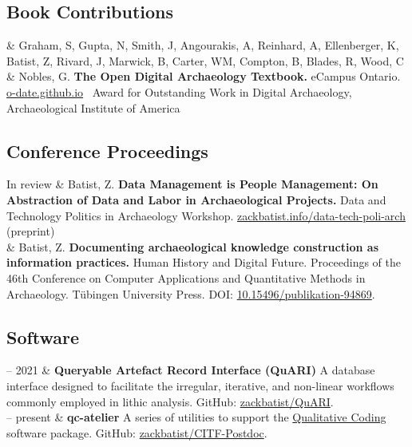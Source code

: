 \documentclass[11pt, a4paper]{article}
\newcommand{\LastName}{Batist}
\newcommand{\Initials}{Z}
\newcommand{\Me}{\LastName, \Initials}
\newcommand{\AndreasAngourakis}{Angourakis, A}
\newcommand{\RobBlades}{Blades, R}
\newcommand{\MichaelCarter}{Carter, WM}
\newcommand{\BethCompton}{Compton, B}
\newcommand{\KateEllenberger}{Ellenberger, K}
\newcommand{\ShawnGraham}{Graham, S}
\newcommand{\NehaGupta}{Gupta, N}
\newcommand{\BenMarwick}{Marwick, B}
\newcommand{\GaryNobles}{Nobles, G}
\newcommand{\AndrewReinhard}{Reinhard, A}
\newcommand{\JoelRivard}{Rivard, J}
\newcommand{\JoleneSmith}{Smith, J}
\newcommand{\CristinaWood}{Wood, C}
\newcommand{\Duration}[2]{\fontsize{9pt}{0}\selectfont #1 -- #2}
\newcommand{\Year}[1]{\fontsize{9pt}{0}\selectfont #1}
\newcommand{\Ongoing}{\fontsize{8pt}{0}\selectfont present}
\newcommand{\Review}{In review}
\newcommand{\DOI}[1]{DOI: \href{https://doi.org/#1}{#1}.}
\newcommand{\GitHub}[1]{GitHub: \href{https://github.com/#1}{#1}.}
\newcommand{\Website}[1]{\href{https://#1}{#1}}
\newcommand{\Sep}{\ |\ }
\newif\iffirstsub
\newcommand{\CVSubsection}[2][-1em]{\Needspace{5\baselineskip}\iffirstsub\else\vspace{-1.6em}\fi\firstsubfalse\subsection{#2}\vspace{#1}}
\begin{document}
\CVSubsection{Book Contributions}
\begin{EntriesTable}
\Year{2018} &
  \ShawnGraham, \NehaGupta, \JoleneSmith, \AndreasAngourakis, \AndrewReinhard, \KateEllenberger, \Me, \JoelRivard, \BenMarwick, \MichaelCarter, \BethCompton, \RobBlades, \CristinaWood { \&} \GaryNobles.
  \textbf{The Open Digital Archaeology Textbook.}
  eCampus Ontario.
  \Website{o-date.github.io}\newline
  \ Award for Outstanding Work in Digital Archaeology, Archaeological Institute of America
\end{EntriesTable}

\CVSubsection{Conference Proceedings}
\begin{EntriesTable}
\Year{\Review} &
  \Me.
  \textbf{Data Management is People Management: On Abstraction of Data and Labor in Archaeological Projects.}
  Data and Technology Politics in Archaeology Workshop.
  \Website{zackbatist.info/data-tech-poli-arch} (preprint)
  \\
\Year{2022} &
  \Me.
  \textbf{Documenting archaeological knowledge construction as information practices.}
  Human History and Digital Future. Proceedings of the 46th Conference on Computer Applications and Quantitative Methods in Archaeology.
  Tübingen University Press.
  \DOI{10.15496/publikation-94869}
\end{EntriesTable}

\CVSubsection{Software}
\begin{EntriesTable}
\Duration{2020}{2021} &
  \textbf{Queryable Artefact Record Interface (QuARI)}
  A database interface designed to facilitate the irregular, iterative, and non-linear workflows commonly employed in lithic analysis.
  \GitHub{zackbatist/QuARI}
  \\
\Duration{2025}{\Ongoing} &
  \textbf{qc-atelier}
  A series of utilities to support the \href{https://qualitative-coding.readthedocs.io/}{Qualitative Coding} software package.
  \GitHub{zackbatist/CITF-Postdoc}
\end{EntriesTable}
\end{document}
